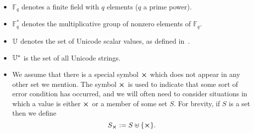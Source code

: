 \begin{itemize}
  \item $\mathbb{F}_q$ denotes a finite field with $q$ elements ($q$ a prime power).%

  \item $\mathbb{F}_q^*$ denotes the multiplicative group of nonzero elements of $\mathbb{F}_q$.%

  \item $\mathbb{U}$ denotes the set of Unicode scalar values, as defined in~\cite[Definition D76]{Unicode-standard}.%

  \item $\mathbb{U}^*$ is the set of all Unicode strings.%

  \item We assume that there is a special symbol $\errorX$ which does not appear
    in any other set we mention.  The symbol $\errorX$ is used to indicate that
    some sort of error condition has occurred, and we will often need to consider
    situations in which a value is either $\errorX$ or a member of some set $S$.
    For brevity, if $S$ is a set then we define
    $$
    \withError{S} := S \disj \{\errorX\}.
    $$%
\end{itemize}%

